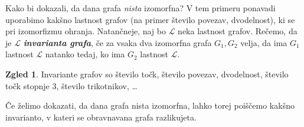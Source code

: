 \documentclass[11pt]{book}
\def\definicija{\color{rdeca}\bf\em}
\theoremstyle{definition}
\theoremstyle{zgled}
\newtheorem*{zgled}{Zgled}
\theoremstyle{odprtproblem}
\theoremstyle{domacanaloga}
\theoremstyle{izrek}
\begin{document}
Kako bi dokazali, da dana grafa \emph{nista} izomorfna? V tem primeru ponavadi uporabimo kakšno lastnost grafov (na primer število povezav, dvodelnost), ki se pri izomorfizmu ohranja. Natančneje, naj bo $\mathcal{L}$ neka lastnost grafov. Rečemo, da je $\mathcal{L}$ {\definicija invarianta grafa}, če za vsaka dva izomorfna grafa $G_1, G_2$ velja, da ima $G_1$ lastnost $\mathcal{L}$ natanko tedaj, ko ima $G_2$ lastnost $\mathcal{L}$.

\begin{zgled}
    Invariante grafov so število točk, število povezav, dvodelnost, število točk stopnje $3$, število trikotnikov, \dots
\end{zgled}

Če želimo dokazati, da dana grafa nista izomorfna, lahko torej poiščemo kakšno invarianto, v kateri se obravnavana grafa razlikujeta.
\end{document}
